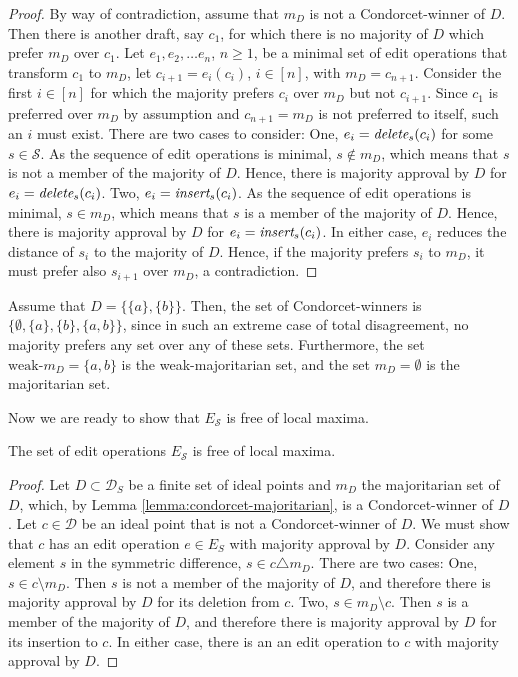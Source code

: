 \documentclass[sigconf]{aamas}  %
\newcommand{\calD}{\mathcal{D}}
\newcommand{\calS}{\mathcal{S}}
\newcommand{\iinsert}[1]{\emph{insert}_{#1}}
\newcommand{\ddelete}[1]{\emph{delete}_{#1}}
\begin{document}
\begin{proof}
%
By way of contradiction, assume that $m_D$ is not a Condorcet-winner of $D$.  Then there is another draft, say $c_1$, for which there is no majority of $D$ which prefer $m_D$ over $c_1$.  
Let $e_1, e_2, \ldots e_n$, $n \ge 1$, be a minimal set of edit operations that transform $c_1$ to $m_D$,  let $c_{i+1} = e_i(c_i)$, $ i \in [n]$, with $m_D = c_{n+1}$. Consider the first $i \in [n]$ for which the majority prefers $c_i$ over $m_D$ but not $c_{i+1}$.  Since $c_1$ is preferred over $m_D$ by assumption and $c_{n+1} = m_D$ is not preferred to itself, such an $i$ must exist.   
There are two cases to consider: One, $e_i = \ddelete{s}(c_i)$ for some $s \in \calS$.  As the sequence of edit operations is minimal,  $s \notin m_D$, which means that $s$ is not a member of the majority of $D$.  Hence, there is majority approval by $D$ for $e_i = \ddelete{s}(c_i)$.
Two, $e_i = \iinsert{s}(c_i)$.  As the sequence of edit operations is minimal,  $s \in m_D$, which means that $s$ is a member of the majority of $D$.  Hence, there is majority approval by $D$ for $e_i = \iinsert{s}(c_i)$.  In either case, $e_i$ reduces the distance of $s_i$ to the majority of $D$. Hence, if the majority prefers $s_i$ to $m_D$, it must prefer also $s_{i+1}$ over $m_D$, a contradiction.
%
\end{proof}

\begin{example}
%
Assume that $D = \{ \{a\}, \{b\} \}$.
Then, the set of Condorcet-winners is
$\{ \emptyset, \{a\}, \{b\}, \{a,b\} \}$, since in such an extreme case of total disagreement, no majority prefers any set over any of these sets.
Furthermore, the set $\textrm{weak-}m_D = \{a, b\}$ is the weak-majoritarian set, and the set $m_D = \emptyset$ is the majoritarian set.
%
\end{example}

Now we are ready to show that $E_\calS$ is free of local maxima.

\begin{lemma}
  The set of edit operations $E_\calS$ is free of local maxima.
\end{lemma}

\begin{proof}
%
Let $D \subset \calD_S$ be a finite set of ideal points and $m_D$ the majoritarian set of $D$, which, by Lemma \ref{lemma:condorcet-majoritarian}, is a Condorcet-winner of $D$.  Let $c \in \calD$ be an ideal point that is not a Condorcet-winner of $D$. We must show that
$c$ has an edit operation $e \in E_S$ with majority approval by $D$. Consider any  element $s$ in the symmetric difference,  $s \in c \triangle m_D$.
There are two cases: One, $s \in c \setminus m_D$. Then $s$ is not a member of the majority of $D$, and therefore there is majority approval by $D$ for its deletion from $c$.
Two, $s \in m_D \setminus c$. Then $s$ is a member of the majority of $D$, and therefore there is majority approval by $D$ for its insertion to  $c$. In either case, there is an an edit operation to $c$ with majority approval by $D$.
%
\end{proof}
\end{document}

